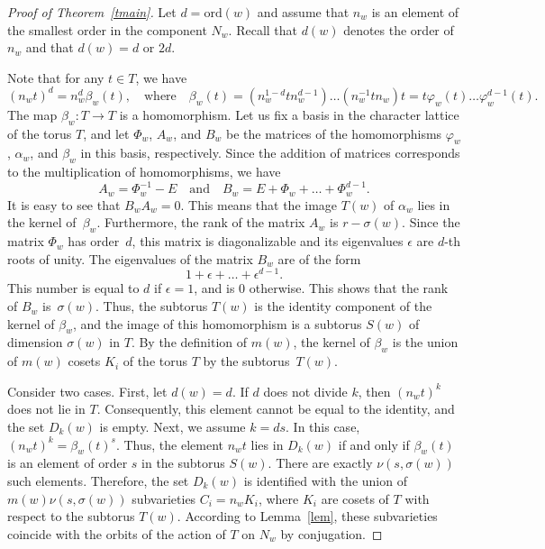 \documentclass[a4paper,12pt]{amsart}
\theoremstyle{plain}
\theoremstyle{definition}
\newcommand{\ord}{\mathrm{ord}}
\begin{document}
\begin{proof}[Proof of Theorem~\ref{tmain}]
Let $d=\ord(w)$ and assume that $n_w$ is an element of the smallest order in the component $N_w$. Recall that $d(w)$ denotes the order of $n_w$ and that $d(w)=d$ or $2d$.

Note that for any $t\in T$, we have
$$
(n_wt)^d=n_w^d\beta_w(t), \quad \text{where} \quad \beta_w(t)=(n_w^{1-d}tn_w^{d-1})\ldots(n_w^{-1}tn_w)t=t\varphi_w(t)\ldots\varphi_w^{d-1}(t).
$$
The map $\beta_w\colon T\to T$ is a homomorphism. Let us fix a basis in the character lattice of the torus $T$, and let $\Phi_w$, $A_w$, and $B_w$ be the matrices of the homomorphisms $\varphi_w$, $\alpha_w$, and $\beta_w$ in this basis, respectively. Since the addition of matrices corresponds to the multiplication of homomorphisms, we have
$$
A_w=\Phi_w^{-1}-E \quad \text{and} \quad B_w=E+\Phi_w+\ldots+\Phi_w^{d-1}.
$$
It is easy to see that $B_wA_w=0$. This means that the image $T(w)$ of $\alpha_w$ lies in the kernel of~$\beta_w$. Furthermore, the rank of the matrix $A_w$ is $r-\sigma(w)$. Since the matrix $\Phi_w$ has order~$d$, this matrix is diagonalizable and its eigenvalues $\epsilon$ are $d$-th roots of unity. The eigenvalues of the matrix $B_w$ are of the form
$$
1+\epsilon+\ldots+\epsilon^{d-1}.
$$
This number is equal to $d$ if $\epsilon=1$, and is $0$ otherwise. This shows that the rank of $B_w$ is~$\sigma(w)$. Thus, the subtorus $T(w)$ is the identity component of the kernel of $\beta_w$, and the image of this homomorphism is a subtorus $S(w)$ of dimension $\sigma(w)$ in $T$. By the definition of $m(w)$, the kernel of $\beta_w$ is the union of $m(w)$ cosets $K_i$ of the torus $T$ by the subtorus~$T(w)$.

\smallskip

Consider two cases. First, let $d(w)=d$. If $d$ does not divide $k$, then $(n_wt)^k$ does not lie in $T$. Consequently, this element cannot be equal to the identity, and the set $D_k(w)$ is empty. Next, we assume $k=ds$. In this case, $(n_wt)^k=\beta_w(t)^s$. Thus, the element $n_wt$ lies in $D_k(w)$ if and only if $\beta_w(t)$ is an element of order $s$ in the subtorus $S(w)$. There are exactly $\nu(s,\sigma(w))$ such elements. Therefore, the set $D_k(w)$ is identified with the union of $m(w)\nu(s,\sigma(w))$ subvarieties $C_i=n_wK_i$, where $K_i$ are cosets of $T$ with respect to the subtorus $T(w)$. According to Lemma~\ref{lem}, these subvarieties coincide with the orbits of the action of $T$ on $N_w$ by conjugation.

\smallskip


\end{proof}
\end{document}

